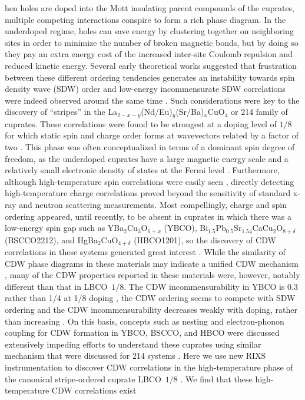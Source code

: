 \documentclass[9pt,twocolumn,twoside]{pnas-new}
\def\LBCO{LBCO~$1/8$}
\begin{document}
hen holes are doped into the Mott insulating parent compounds of the cuprates, multiple competing interactions conspire to form a rich phase diagram. In the underdoped regime, holes can save energy by clustering together on neighboring sites in order to minimize the number of broken magnetic bonds, but by doing so they pay an extra energy cost of the increased inter-site Coulomb repulsion and reduced kinetic energy. Several early theoretical works suggested that frustration between these different ordering tendencies generates an instability towards spin density wave (SDW) order \cite{Zaanen1989,Machida1989, Poilblanc1989, Emery1990, Kato1990} and low-energy incommensurate SDW correlations were indeed observed around the same time \cite{Birgeneau1989, Cheong1991, Thurston1992}. Such considerations were key to the discovery of ``stripes'' in the La$_{2-x-y}$(Nd/Eu)$_{y}$(Sr/Ba)$_{x}$CuO$_4$ or 214 family of cuprates. These correlations were found to be strongest at a doping level of $1/8$ for which static spin and charge order forms at wavevectors related by a factor of two \cite{Tranquada1995, Fujita2004}. This phase was often conceptualized in terms of a dominant spin degree of freedom, as the underdoped cuprates have a large magnetic energy scale and a relatively small electronic density of states at the Fermi level \cite{Zaanen1989,Machida1989, Poilblanc1989, Emery1990, Kato1990}. Furthermore, although high-temperature spin correlations were easily seen \cite{Cheong1991, Thurston1992, Fujita2004}, directly detecting high-temperature charge correlations proved beyond the sensitivity of standard x-ray and neutron scattering measurements. Most compellingly, charge and spin ordering appeared, until recently, to be absent in cuprates in which there was a low-energy spin gap such as YBa$_2$Cu$_3$O$_{6+x}$ (YBCO), Bi$_{1.5}$Pb$_{0.5}$Sr$_{1.54}$CaCu$_{2}$O$_{8+\delta}$ (BSCCO2212), and HgBa$_{2}$CuO$_{4+\delta}$ (HBCO1201), so the discovery of CDW correlations in these systems generated great interest \cite{Ghiringhelli2012, Chang2012, Achkar2012,Sebastian2012, Comin2014,Neto2014, Thampy2014, Hashimoto2014, tabis2014}. While the similarity of CDW phase diagrams in these materials may indicate a unified CDW mechanism \cite{Comin2016, Fradkin2015}, many of the CDW properties reported in these materials were, however, notably different than that in \LBCO{}. The CDW incommensurability in YBCO is 0.3 rather than 1/4 at 1/8 doping \cite{Ghiringhelli2012, Chang2012}, the CDW ordering seems to compete with SDW ordering  \cite{Blanco-Canosa2013,Blanco-Canosa2014, Hucker2014} and the CDW incommensurability decreases weakly with doping, rather than increasing \cite{Blanco-Canosa2014, Hucker2014,Neto2014, Comin2016}. On this basis, concepts such as nesting and electron-phonon coupling for CDW formation in YBCO, BSCCO, and HBCO were discussed extensively impeding efforts to understand these cuprates using similar mechanism that were discussed for 214 systems \cite{Comin2014,LeTacon2014,Wang2014,Comin2016,Liu2016}. Here we use new RIXS instrumentation to discover CDW correlations in the high-temperature phase of the canonical stripe-ordered cuprate \LBCO{} \cite{Fujita2004, Hucker2011, Wilkins2011, Chen2016, Achkar2016}. We find that these high-temperature CDW correlations exist 
\end{document}
